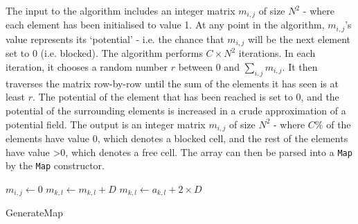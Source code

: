 \documentclass[12pt,notitlepage]{report}
\begin{document}
\noindent
The input to the algorithm includes an integer matrix $m_{i,j}$ of size $N^{2}$ - where each element has been initialised to value 1. At any point in the algorithm, $m_{i,j}$'s value represents its `potential' - i.e. the chance that $m_{i,j}$ will be the next element set to 0 (i.e. blocked). The algorithm performs $C \times N^{2}$ iterations. In each iteration, it chooses a random number $r$ between $0$ and $\sum\limits_{i,j} m_{i,j}$. It then traverses the matrix row-by-row until the sum of the elements it has seen is at least $r$. The potential of the element that has been reached is set to $0$, and the potential of the surrounding elements is increased in a crude approximation of a potential field. The output is an integer matrix $m_{i,j}$ of size $N^{2}$ - where $C\%$ of the elements have value 0, which denotes a blocked cell, and the rest of the elements have value \textgreater $0$, which denotes a free cell. The array can then be parsed into a {\tt Map} by the {\tt Map} constructor.

\begin{algorithm}[htp]
  \SetAlgoLined\DontPrintSemicolon
   
   {
    \nl $m_{i,j} \gets 0$\;
    \nl {} {
      \nl {} {
        \nl $m_{k,l} \gets m_{k,l} + D$\;
      }
  }
  \nl {} {
      \nl {} {
        $m_{k,l} \gets a_{k,l} + 2\times D$\;
      }
  }
}
\caption{{\sc GenerateMap}}
 \end{algorithm} 
 
\end{document}
